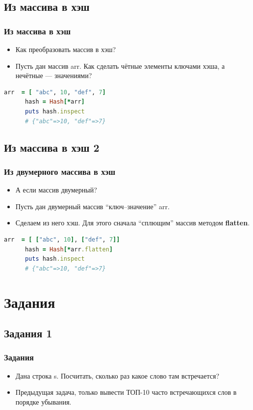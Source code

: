 \documentclass[compress,red]{beamer}
\begin{document}
\subsection{Из массива в хэш}
\begin{frame}[fragile]
  \frametitle{Из массива в хэш}

  \begin{itemize}
    \item Как преобразовать массив в хэш?
    \item Пусть дан массив arr. Как сделать чётные элементы ключами хэша, а нечётные --- значениями?
  \end{itemize}

  \scriptsize{
    \begin{lstlisting}[language=ruby,basicstyle=\footnotesize,label=ruby10,caption=Из массива в хэш]
      arr  = [ "abc", 10, "def", 7]
      hash = Hash[*arr] 
      puts hash.inspect
      # {"abc"=>10, "def"=>7}
    \end{lstlisting}
  }

\end{frame}
\subsection{Из массива в хэш 2}
\begin{frame}[fragile]
  \frametitle{Из двумерного массива в хэш}

  \begin{itemize}
    \item А если массив двумерный?
    \item Пусть дан двумерный массив ``ключ--значение'' arr.
    \item Сделаем из него хэш. Для этого сначала ``сплющим'' массив методом \textbf{flatten}.
  \end{itemize}

  \scriptsize{
    \begin{lstlisting}[language=ruby,basicstyle=\footnotesize,label=ruby11,caption=Из массива в хэш]
      arr  = [ ["abc", 10], ["def", 7]]
      hash = Hash[*arr.flatten] 
      puts hash.inspect
      # {"abc"=>10, "def"=>7}
    \end{lstlisting}
  }

\end{frame}

\section{Задания}
\subsection{Задания 1}
\begin{frame}
  \frametitle{Задания}
  \begin{itemize}
    \item Дана строка s. Посчитать, сколько раз какое слово там встречается?
    \item Предыдущая задача, только вывести ТОП-10 часто встречающихся слов в порядке убывания.
  \end{itemize}
\end{frame}
\end{document}
